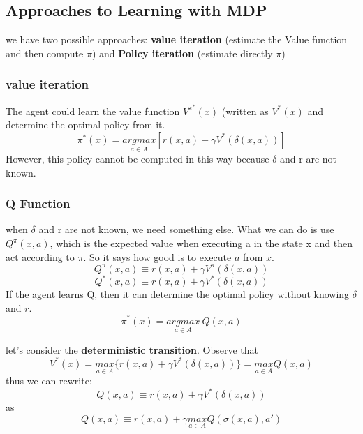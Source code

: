 \subsection{Approaches to Learning with MDP}
we have two possible approaches: \textbf{value iteration} (estimate the Value function and then compute $\pi$) and \textbf{Policy iteration} (estimate directly $\pi$)

\subsubsection{value iteration}
The agent could learn the value function $V^{\pi^{*}}(x)$ (written as $V^{*}(x)$ and determine the optimal policy from it.
\begin{equation}
    \pi^{*}(x) = \underset{a \in A}{argmax}\left[r(x, a) + \gamma V^{*}(\delta(x, a))\right]
\end{equation}
However, this policy cannot be computed in this way because $\delta$ and r are not known.

\subsubsection{Q Function}
when $\delta$ and r are not known, we need something else.
What we can do is use $Q^{\pi}(x, a)$, which is the expected value when executing a in the state x and then act according to $\pi$. So it says how good is to execute $a$ from $x$.
\begin{equation}
    Q^{\pi}(x, a) \equiv r(x, a) + \gamma V^{\pi}(\delta(x, a))
\end{equation}
\begin{equation}
    Q^{*}(x, a) \equiv r(x, a) + \gamma V^{*}(\delta(x, a))
\end{equation}
If the agent learns Q, then it can determine the optimal policy without knowing $\delta$ and $r$.
\begin{equation}
    \pi^{*}(x) = \underset{a \in A}{argmax}\ Q(x, a)
\end{equation}

let's consider the \textbf{deterministic transition}. Observe that
\begin{equation}
    V^{*}(x) = \underset{a \in A}{max}\{r(x, a) + \gamma V^{*}(\delta(x, a))\} = \underset{a \in A}{max} Q(x, a)
\end{equation}
thus we can rewrite:
\begin{equation}
    Q(x, a) \equiv r(x, a) + \gamma V^{*}(\delta(x, a))
\end{equation}
as
\begin{equation}
    Q(x, a) \equiv r(x, a) + \gamma \underset{a \in A}{max} Q(\sigma(x, a), a')
\end{equation}

